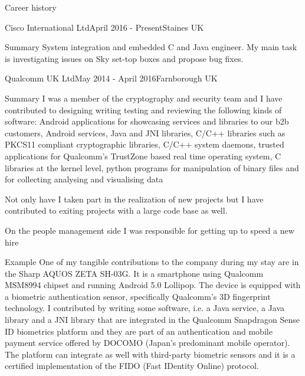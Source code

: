 \documentclass{resume}
\begin{document}
  \begin{rSection}{Career history}
    \begin{rSubsection}{Cisco International Ltd}{April 2016 - Present}{}{Staines UK}
    \item[Summary]
      System integration and embedded C and Java engineer. My main task is investigating issues on Sky set-top boxes and propose bug fixes. 
    \end{rSubsection}

    \begin{rSubsection}{Qualcomm UK Ltd}{May 2014 - April 2016}{}{Farnborough UK}
	\item[Summary]
	  I was a member of the cryptography and security team and I have contributed to designing writing testing and reviewing the following kinds of software:
	  Android applications for showcasing services and libraries to our b2b customers,
	  Android services, 
	  Java and JNI libraries, 
	  C/C++ libraries such as PKCS11 compliant cryptographic libraries,
	  C/C++ system daemons,
	  trusted applications for Qualcomm's TrustZone based real time operating system,
	  C libraries at the kernel level,
	  python programs for manipulation of binary files and for collecting analysing and visualising data

	  Not only have I taken part in the realization of new projects but I have contributed to exiting projects with a large code base as well.

	  On the people management side I was responsible for getting up to speed a new hire
	  
	  
	\item[Example]
	  One of my tangible contributions to the company during my stay are in the Sharp AQUOS ZETA SH-03G.
	  It is a smartphone using Qualcomm MSM8994 chipset and running Android 5.0 Lollipop. 
	  The device is equipped with a biometric authentication sensor, specifically
	  Qualcomm's 3D fingerprint technology.
	  I contributed by writing some software, i.e. a Java service, a Java library and a JNI library
	  that are integrated in the Qualcomm Snapdragon Sense ID biometrics platform and they
	  are part of an authentication and mobile payment service offered by DOCOMO (Japan's predominant mobile operator).
	  The platform can integrate as well with third-party biometric sensors and it is a certified
	  implementation of the FIDO (Fast IDentity Online) protocol.
    \end{rSubsection}


\end{rSection}
\end{document}
